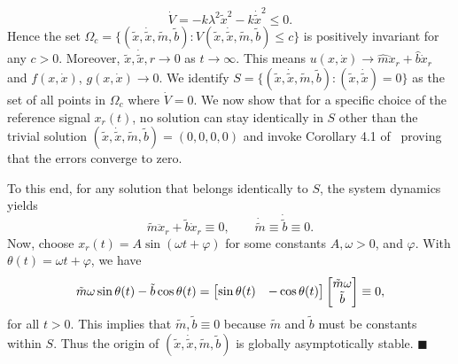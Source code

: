 \[\dot{V} = -k\lambda^2\tilde{x}^2 - k\dot{\tilde{x}}^2 \leq 0. \]
%
Hence the set $\Omega_c = \{(\tilde{x}, \dot{\tilde{x}}, \tilde{m}, \tilde{b}):
V(\tilde{x}, \dot{\tilde{x}}, \tilde{m}, \tilde{b}) \leq c \}$ is positively
invariant for any $c > 0$. Moreover, $\tilde{x}, \dot{\tilde{x}}, r \rightarrow
0$ as $t \rightarrow \infty$. This means $u(x, \dot{x}) \rightarrow
\hat{m}\ddot{x}_r + \hat{b}\dot{x}_r$ and $f(x, \dot{x})$, $g(x, \dot{x})
\rightarrow 0$. We identify $S = \{(\tilde{x}, \dot{\tilde{x}}, \tilde{m},
\tilde{b}): (\tilde{x}, \dot{\tilde{x}}) = 0\}$ as the set of all points in
$\Omega_c$ where $\dot{V} = 0$. We now show that for a specific choice of the
reference signal $x_r(t)$, no solution can stay identically in $S$ other than
the trivial solution $(\tilde{x}, \dot{\tilde{x}}, \tilde{m}, \tilde{b}) =
(0,0,0,0)$ and invoke Corollary 4.1 of~\cite{khalil2015nonlinear} proving that
the errors converge to zero.

To this end, for any solution that belongs identically to $S$, the system
dynamics yields \[ \tilde{m}\ddot{x}_r + \tilde{b}\dot{x}_r \equiv 0, \qquad
\dot{\tilde{m}} \equiv \dot{\tilde{b}} \equiv 0. \] Now,
choose $\boxed{x_r(t) = A\sin{(\omega t + \varphi)}}$ for some constants $A,
\omega > 0$, and $\varphi$. With $\theta(t) = \omega t + \varphi$, we have \[
\tilde{m}\omega\sin{\theta(t)} - \tilde{b}\cos{\theta(t)} = \begin{bmatrix}\sin{\theta(t)} &
-\cos{\theta(t)}\end{bmatrix}\begin{bmatrix}\tilde{m}\omega \\ \tilde{b}\end{bmatrix} \equiv 0, \] for all $t > 0$.
This implies that $\tilde{m}, \tilde{b} \equiv 0$ because $\tilde{m}$ and
$\tilde{b}$ must be constants within $S$. Thus the origin of $(\tilde{x},
\dot{\tilde{x}}, \tilde{m}, \tilde{b})$ is globally asymptotically stable.
\hfill $\blacksquare$
